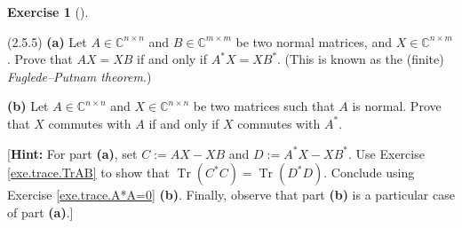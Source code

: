 \documentclass[numbers=enddot,12pt,final,onecolumn,notitlepage]{scrartcl}
\newcounter{exer}
\theoremstyle{definition}
\newtheorem{exmp}[exer]{Exercise}
\newenvironment{exercise}[1][]
{\begin{exmp}[#1]\begin{leftbar}}
        {\end{leftbar}\end{exmp}}
\begin{document}
\begin{exercise}
	\label{exe.schurtri.normal.fp} (2.5.5) \textbf{(a)} Let $A\in\mathbb{C}%
		^{n\times n}$ and $B\in\mathbb{C}^{m\times m}$ be two normal matrices, and
	$X\in\mathbb{C}^{n\times m}$. Prove that $AX=XB$ if and only if $A^{\ast
			}X=XB^{\ast}$. (This is known as the (finite) \emph{Fuglede--Putnam
		theorem}.)\medskip

	\textbf{(b)} Let $A\in\mathbb{C}^{n\times n}$ and $X\in\mathbb{C}^{n\times n}$
	be two matrices such that $A$ is normal. Prove that $X$ commutes with $A$ if
	and only if $X$ commutes with $A^{\ast}$. \medskip

	[\textbf{Hint:} For part \textbf{(a)}, set $C:=AX-XB$ and $D:=A^{\ast
		}X-XB^{\ast}$. Use Exercise \ref{exe.trace.TrAB} to show that
	$\operatorname*{Tr}\left(  C^{\ast}C\right)  =\operatorname*{Tr}\left(
		D^{\ast}D\right)  $. Conclude using Exercise \ref{exe.trace.A*A=0}
	\textbf{(b)}. Finally, observe that part \textbf{(b)} is a particular case of
	part \textbf{(a)}.]
\end{exercise}
\end{document}
